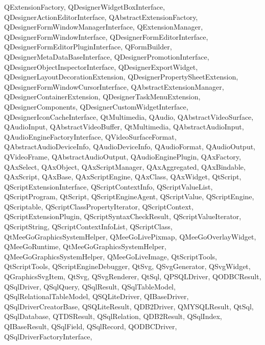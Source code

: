 {{    QExtensionFactory,%
    QDesignerWidgetBoxInterface,%
    QDesignerActionEditorInterface,%
    QAbstractExtensionFactory,%
    QDesignerFormWindowManagerInterface,%
    QExtensionManager,%
    QDesignerFormWindowInterface,%
    QDesignerFormEditorInterface,%
    QDesignerFormEditorPluginInterface,%
    QFormBuilder,%
    QDesignerMetaDataBaseInterface,%
    QDesignerPromotionInterface,%
    QDesignerObjectInspectorInterface,%
    QDesignerExportWidget,%
    QDesignerLayoutDecorationExtension,%
    QDesignerPropertySheetExtension,%
    QDesignerFormWindowCursorInterface,%
    QAbstractExtensionManager,%
    QDesignerContainerExtension,%
    QDesignerTaskMenuExtension,%
    QDesignerComponents,%
    QDesignerCustomWidgetInterface,%
    QDesignerIconCacheInterface,%
    QtMultimedia,%
    QAudio,%
    QAbstractVideoSurface,%
    QAudioInput,%
    QAbstractVideoBuffer,%
    QtMultimedia,%
    QAbstractAudioInput,%
    QAudioEngineFactoryInterface,%
    QVideoSurfaceFormat,%
    QAbstractAudioDeviceInfo,%
    QAudioDeviceInfo,%
    QAudioFormat,%
    QAudioOutput,%
    QVideoFrame,%
    QAbstractAudioOutput,%
    QAudioEnginePlugin,%
    QAxFactory,%
    QAxSelect,%
    QAxObject,%
    QAxScriptManager,%
    QAxAggregated,%
    QAxBindable,%
    QAxScript,%
    QAxBase,%
    QAxScriptEngine,%
    QAxClass,%
    QAxWidget,%
    QtScript,%
    QScriptExtensionInterface,%
    QScriptContextInfo,%
    QScriptValueList,%
    QScriptProgram,%
    QtScript,%
    QScriptEngineAgent,%
    QScriptValue,%
    QScriptEngine,%
    QScriptable,%
    QScriptClassPropertyIterator,%
    QScriptContext,%
    QScriptExtensionPlugin,%
    QScriptSyntaxCheckResult,%
    QScriptValueIterator,%
    QScriptString,%
    QScriptContextInfoList,%
    QScriptClass,%
    QtMeeGoGraphicsSystemHelper,%
    QMeeGoLivePixmap,%
    QMeeGoOverlayWidget,%
    QMeeGoRuntime,%
    QtMeeGoGraphicsSystemHelper,%
    QMeeGoGraphicsSystemHelper,%
    QMeeGoLiveImage,%
    QtScriptTools,%
    QtScriptTools,%
    QScriptEngineDebugger,%
    QtSvg,%
    QSvgGenerator,%
    QSvgWidget,%
    QGraphicsSvgItem,%
    QtSvg,%
    QSvgRenderer,%
    QtSql,%
    QPSQLDriver,%
    QODBCResult,%
    QSqlDriver,%
    QSqlQuery,%
    QSqlResult,%
    QSqlTableModel,%
    QSqlRelationalTableModel,%
    QSQLiteDriver,%
    QIBaseDriver,%
    QSqlDriverCreatorBase,%
    QSQLiteResult,%
    QDB2Driver,%
    QMYSQLResult,%
    QtSql,%
    QSqlDatabase,%
    QTDSResult,%
    QSqlRelation,%
    QDB2Result,%
    QSqlIndex,%
    QIBaseResult,%
    QSqlField,%
    QSqlRecord,%
    QODBCDriver,%
    QSqlDriverFactoryInterface,%
}}
